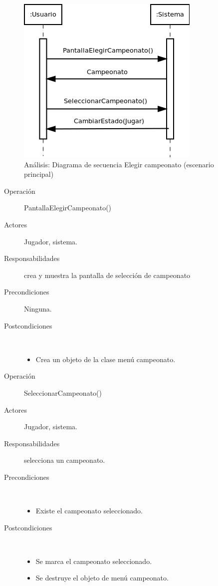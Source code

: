 \begin{figure}[H] 
  \label{secuencia_elegir_campeonato}
  \begin{center}
    \includegraphics[scale=0.7]{imagenes/analisis/secuencia_elegir_campeonato.png}
  \end{center}
  \caption{Análisis: Diagrama de secuencia Elegir campeonato (escenario principal)}
\end{figure}

\begin{description}
    \item [Operación] PantallaElegirCampeonato()
    \item [Actores] Jugador, sistema.
    \item [Responsabilidades] crea y muestra la pantalla de selección de campeonato
    \item [Precondiciones] Ninguna.
    \item [Postcondiciones] $\quad$
        \begin{itemize}
            \item Crea un objeto de la clase menú campeonato.
        \end{itemize}
\end{description}

\begin{description}
    \item [Operación] SeleccionarCampeonato()
    \item [Actores] Jugador, sistema.
    \item [Responsabilidades] selecciona un campeonato.
    \item [Precondiciones] $\quad$
        \begin{itemize}
            \item Existe el campeonato seleccionado.
        \end{itemize}
    \item [Postcondiciones] $\quad$
        \begin{itemize}
            \item Se marca el campeonato seleccionado.
            \item Se destruye el objeto de menú campeonato.
        \end{itemize}
\end{description}

